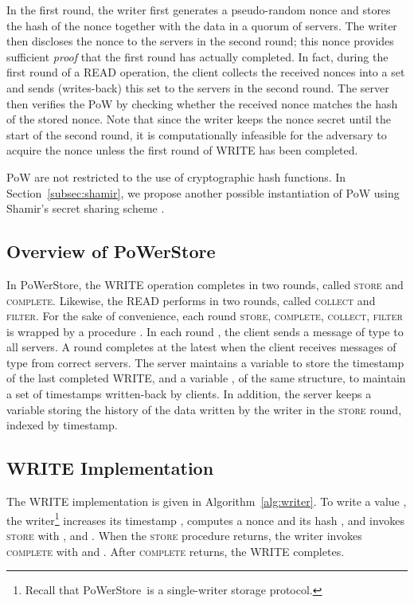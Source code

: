 \documentclass[10pt,conference,compsocconf]{IEEEtran}
\newcommand{\protocol}{PoWerStore}
\newcommand{\complete}{\textsc{complete}}
\begin{document}
In the first round, the writer first generates a pseudo-random nonce and stores the hash of the nonce together with the data in a quorum of servers. The writer then discloses the nonce to the servers in the second round; this nonce provides sufficient \emph{proof} that the first round has actually completed. In fact, during the first round of a \textsc{READ} operation, the client collects the received nonces into a set and sends (writes-back) this set to the servers in the second round. The server then verifies the PoW by checking whether the received nonce matches the hash of the stored nonce. Note that since the writer keeps the nonce secret until the start of the second round, it is computationally infeasible for the adversary to acquire the nonce unless the first round of \textsc{WRITE} has been completed.

PoW are not restricted to the use of cryptographic hash functions. In Section~\ref{subsec:shamir}, we propose another possible instantiation of PoW using Shamir's secret sharing scheme \cite{Sha79}.

\subsection{Overview of \protocol}

In \protocol, the \textsc{WRITE} operation completes in two rounds, called \textsc{store} and \textsc{\complete}. Likewise, the \textsc{READ} performs in two rounds, called \textsc{collect} and \textsc{filter}. For the sake of convenience, each round \textsc{store}, \textsc{\complete}, \textsc{collect}, \textsc{filter} is wrapped by a procedure . In each round , the client sends a message of type  to all servers. A round completes at the latest when the client receives messages of type  from  correct servers. The server maintains a variable  to store the timestamp of the last completed \textsc{WRITE}, and a variable , of the same structure, to maintain a set of timestamps written-back by clients. In addition, the server keeps a variable  storing the history of the data written by the writer in the \textsc{store} round, indexed by timestamp.

\subsection{\textsc{WRITE} Implementation}

The \textsc{WRITE} implementation is given in Algorithm~\ref{alg:writer}. To write a value , the writer\footnote{Recall that \protocol\ is a single-writer storage protocol.} increases its timestamp , computes a nonce  and its hash , and invokes \textsc{store} with ,  and . When the \textsc{store} procedure returns, the writer invokes \textsc{\complete} with  and . After \textsc{\complete} returns, the \textsc{WRITE} completes.
\end{document}
